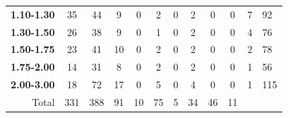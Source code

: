 \begin{table}
\begin{tabular}{r|cccccccccll}
\textbf{1.10-1.30}        & 35                          & 44                          & 9                           & 0                        & 2                          & 0                          & 2                          & 0                        & 0                          & 7      & 92    \\
\textbf{1.30-1.50}        & 26                          & 38                          & 9                           & 0                        & 1                          & 0                          & 2                          & 0                        & 0                          & 4      & 76    \\
\textbf{1.50-1.75}        & 23                          & 41                          & 10                          & 0                        & 2                          & 0                          & 2                          & 0                        & 0                          & 2      & 78    \\
\textbf{1.75-2.00}        & 14                          & 31                          & 8                           & 0                        & 2                          & 0                          & 2                          & 0                        & 0                          & 1      & 56    \\
\textbf{2.00-3.00}        & 18                          & 72                          & 17                          & 0                        & 5                          & 0                          & 4                          & 0                        & 0                          & 1      & 115   \\ \hline
Total                     & 331                         & 388                         & 91                          & 10                       & 75                         & 5                          & 34                         & 46                       & 11                         &        &      
\end{tabular}
\end{table}

